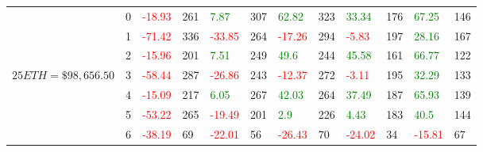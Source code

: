 \begin{table}[htb!]
\begin{adjustwidth}{-0.9in}{-0.9in}
\begin{tabular}{|p{5em}|p{2em}|p{3em}|p{3em}|p{3em}|p{3em}|p{3em}|p{3em}|p{3em}|p{3em}|p{3em}|p{3em}|}
            & 0 & \textcolor{red}{-18.93} & 261 & \textcolor{green}{7.87} & 307 & \textcolor{green}{62.82} & 323 & \textcolor{green}{33.34} & 176 & \textcolor{green}{67.25} & 146\\\cline{3-12}
            & 1 & \textcolor{red}{-71.42} & 336 & \textcolor{red}{-33.85} & 264 & \textcolor{red}{-17.26} & 294 & \textcolor{red}{-5.83} & 197 & \textcolor{green}{28.16} & 167\\\cline{3-12}
            & 2 & \textcolor{red}{-15.96} & 201 & \textcolor{green}{7.51} & 249 & \textcolor{green}{49.6} & 244 & \textcolor{green}{45.58} & 161 & \textcolor{green}{66.77} & 122\\\cline{3-12}
            $25 ETH = \$98,656.50$ & 3 & \textcolor{red}{-58.44} & 287 & \textcolor{red}{-26.86} & 243 & \textcolor{red}{-12.37} & 272 & \textcolor{red}{-3.11} & 195 & \textcolor{green}{32.29} & 133\\[-3ex]\cline{3-12}
            & 4 & \textcolor{red}{-15.09} & 217 & \textcolor{green}{6.05} & 267 & \textcolor{green}{42.03} & 264 & \textcolor{green}{37.49} & 187 & \textcolor{green}{65.93} & 139\\\cline{3-12}
            & 5 & \textcolor{red}{-53.22} & 265 & \textcolor{red}{-19.49} & 201 & \textcolor{green}{2.9} & 226 & \textcolor{green}{4.43} & 183 & \textcolor{green}{40.5} & 144\\\cline{3-12}
            & 6 & \textcolor{red}{-38.19} & 69 & \textcolor{red}{-22.01} & 56 & \textcolor{red}{-26.43} & 70 & \textcolor{red}{-24.02} & 34 & \textcolor{red}{-15.81} & 67\\\hline\hline


\end{tabular}
\end{adjustwidth}
\end{table}
